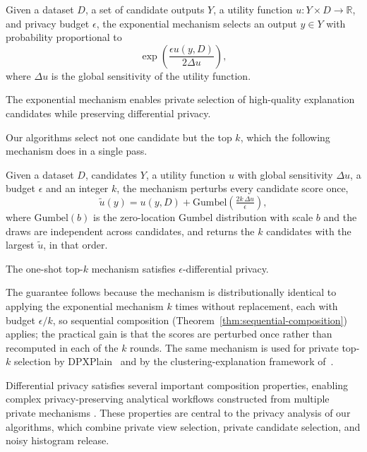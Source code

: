 \begin{definition}
\label{def:exponential-mechanism}
Given a dataset $D$, a set of candidate outputs $Y$, a utility function
$u:Y\times D\rightarrow\mathbb{R}$, and privacy budget $\epsilon$, the exponential
mechanism selects an output $y\in Y$ with probability proportional to
\[
\exp\left(
\frac{\epsilon u(y,D)}
{2\Delta u}
\right),
\]
where $\Delta u$ is the global sensitivity of the utility function.
\end{definition}

The exponential mechanism enables private selection of high-quality explanation
candidates while preserving differential privacy.

Our algorithms select not one candidate but the top $k$, which the following mechanism does in a single pass.

\begin{definition}
\label{def:oneshot-topk}
Given a dataset $D$, candidates $Y$, a utility function $u$ with global sensitivity $\Delta u$, a budget $\epsilon$ and an integer $k$, the mechanism perturbs every candidate score once,
\[
\tilde{u}(y)=u(y,D)+\mathrm{Gumbel}\!\left(\tfrac{2k\,\Delta u}{\epsilon}\right),
\]
where $\mathrm{Gumbel}(b)$ is the zero-location Gumbel distribution with scale $b$
and the draws are independent across candidates,
and returns the $k$ candidates with the largest $\tilde{u}$, in that order.
\end{definition}

\begin{theorem}
\label{thm:oneshot-topk}
The one-shot top-$k$ mechanism satisfies $\epsilon$-differential privacy.
\end{theorem}

The guarantee follows because the mechanism is distributionally identical to applying the exponential mechanism $k$ times without replacement, each with budget $\epsilon/k$, so sequential composition (Theorem~\ref{thm:sequential-composition}) applies; the practical gain is that the scores are perturbed once rather than recomputed in each of the $k$ rounds.
The same mechanism is used for private top-$k$ selection by DPXPlain~\cite{TaoGMR22} and by the clustering-explanation framework of~\cite{DPClustX}.


Differential privacy satisfies several important composition properties, enabling
complex privacy-preserving analytical workflows constructed from multiple private
mechanisms \cite{mcsherry2009,DBLP:series/synthesis/2016Li,bun2016}.
These properties are central to the privacy analysis of our algorithms, which combine
private view selection, private candidate selection, and noisy histogram release.

